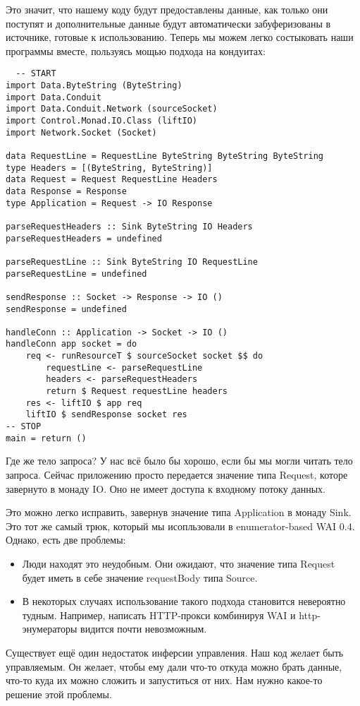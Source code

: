 Это значит, что нашему коду будут предоставлены данные, как только они поступят и дополнительные данные будут автоматически забуферизованы в источнике, готовые к использованию. Теперь мы можем легко состыковать наши программы вместе, пользуясь мощью подхода на кондуитах:
\begin{lstlisting}
  -- START
import Data.ByteString (ByteString)
import Data.Conduit
import Data.Conduit.Network (sourceSocket)
import Control.Monad.IO.Class (liftIO)
import Network.Socket (Socket)

data RequestLine = RequestLine ByteString ByteString ByteString
type Headers = [(ByteString, ByteString)]
data Request = Request RequestLine Headers
data Response = Response
type Application = Request -> IO Response

parseRequestHeaders :: Sink ByteString IO Headers
parseRequestHeaders = undefined

parseRequestLine :: Sink ByteString IO RequestLine
parseRequestLine = undefined

sendResponse :: Socket -> Response -> IO ()
sendResponse = undefined

handleConn :: Application -> Socket -> IO ()
handleConn app socket = do
    req <- runResourceT $ sourceSocket socket $$ do
        requestLine <- parseRequestLine
        headers <- parseRequestHeaders
        return $ Request requestLine headers
    res <- liftIO $ app req
    liftIO $ sendResponse socket res
-- STOP
main = return ()
\end{lstlisting}
Где же тело запроса? У нас всё было бы хорошо, если бы мы могли читать тело запроса. Сейчас
приложению просто передается значение типа Request, которе завернуто в монаду IO. 
Оно не имеет доступа к входному потоку данных.

Это можно легко исправить, завернув значение типа Application в монаду Sink. 
Это тот же самый трюк, который мы исопльзовали в enumerator-based WAI 0.4. 
Однако, есть две проблемы:

\begin{itemize}
\item Люди находят это неудобным. Они ожидают, что значение типа Request будет иметь в себе значение requestBody типа Source.
\item В некоторых случаях использование такого подхода становится невероятно тудным. Например, написать HTTP-прокси комбинируя WAI и http-энумераторы видится почти невозможным.
\end{itemize}
Существует ещё один недостаток инферсии управления. Наш код желает быть управляемым.
Он желает, чтобы ему дали что-то откуда можно брать данные, что-то куда их можно сложить и запуститься от них. Нам нужно какое-то решение этой проблемы.

